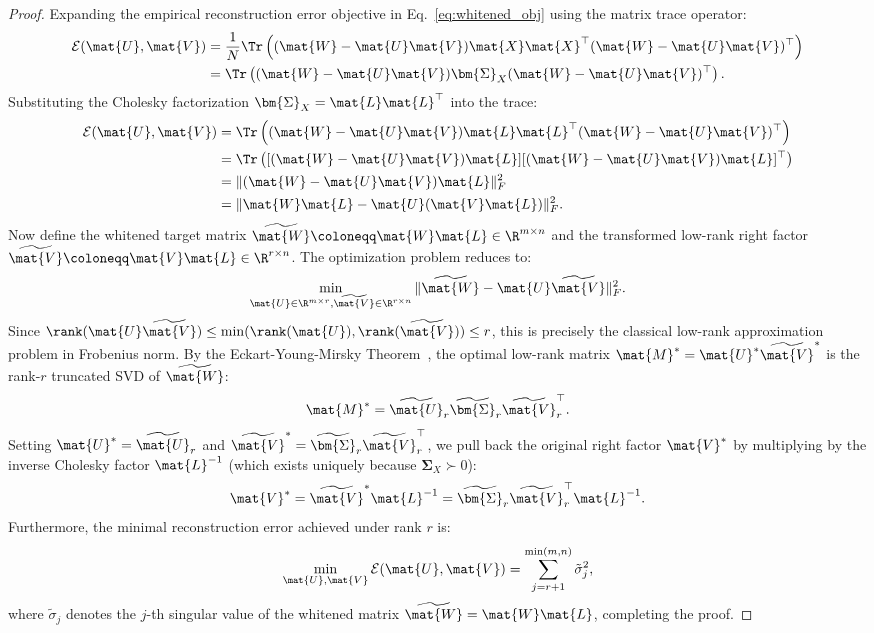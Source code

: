 \begin{proof}
Expanding the empirical reconstruction error objective in Eq.~\eqref{eq:whitened_obj} using the matrix trace operator:
\begin{align}
\mathcal{E}(\mat{U}, \mat{V}) &= \frac{1}{N} \Tr\left( (\mat{W} - \mat{U}\mat{V})\mat{X}\mat{X}^\top (\mat{W} - \mat{U}\mat{V})^\top \right) \\
&= \Tr\left( (\mat{W} - \mat{U}\mat{V}) \bm{\Sigma}_X (\mat{W} - \mat{U}\mat{V})^\top \right).
\end{align}
Substituting the Cholesky factorization $\bm{\Sigma}_X = \mat{L}\mat{L}^\top$ into the trace:
\begin{align}
\mathcal{E}(\mat{U}, \mat{V}) &= \Tr\left( (\mat{W} - \mat{U}\mat{V})\mat{L} \mat{L}^\top (\mat{W} - \mat{U}\mat{V})^\top \right) \\
&= \Tr\left( [(\mat{W} - \mat{U}\mat{V})\mat{L}] [(\mat{W} - \mat{U}\mat{V})\mat{L}]^\top \right) \\
&= \|(\mat{W} - \mat{U}\mat{V})\mat{L}\|_F^2 \\
&= \|\mat{W}\mat{L} - \mat{U}(\mat{V}\mat{L})\|_F^2.
\end{align}
Now define the whitened target matrix $\widetilde{\mat{W}} \coloneqq \mat{W}\mat{L} \in \R^{m \times n}$ and the transformed low-rank right factor $\widetilde{\mat{V}} \coloneqq \mat{V}\mat{L} \in \R^{r \times n}$. The optimization problem reduces to:
\begin{equation}
\min_{\mat{U} \in \R^{m \times r}, \widetilde{\mat{V}} \in \R^{r \times n}} \|\widetilde{\mat{W}} - \mat{U}\widetilde{\mat{V}}\|_F^2.
\end{equation}
Since $\rank(\mat{U}\widetilde{\mat{V}}) \le \min(\rank(\mat{U}), \rank(\widetilde{\mat{V}})) \le r$, this is precisely the classical low-rank approximation problem in Frobenius norm. By the Eckart-Young-Mirsky Theorem~\cite{eckart1936approximation}, the optimal low-rank matrix $\mat{M}^* = \mat{U}^*\widetilde{\mat{V}}^*$ is the rank-$r$ truncated SVD of $\widetilde{\mat{W}}$:
\begin{equation}
\mat{M}^* = \widetilde{\mat{U}}_r \widetilde{\bm{\Sigma}}_r \widetilde{\mat{V}}_r^\top.
\end{equation}
Setting $\mat{U}^* = \widetilde{\mat{U}}_r$ and $\widetilde{\mat{V}}^* = \widetilde{\bm{\Sigma}}_r \widetilde{\mat{V}}_r^\top$, we pull back the original right factor $\mat{V}^*$ by multiplying by the inverse Cholesky factor $\mat{L}^{-1}$ (which exists uniquely because $\bm{\Sigma}_X \succ 0$):
\begin{equation}
\mat{V}^* = \widetilde{\mat{V}}^* \mat{L}^{-1} = \widetilde{\bm{\Sigma}}_r \widetilde{\mat{V}}_r^\top \mat{L}^{-1}.
\end{equation}
Furthermore, the minimal reconstruction error achieved under rank $r$ is:
\begin{equation}
\min_{\mat{U}, \mat{V}} \mathcal{E}(\mat{U}, \mat{V}) = \sum_{j=r+1}^{\min(m, n)} \tilde{\sigma}_j^2,
\end{equation}
where $\tilde{\sigma}_j$ denotes the $j$-th singular value of the whitened matrix $\widetilde{\mat{W}} = \mat{W}\mat{L}$, completing the proof.
\end{proof}


